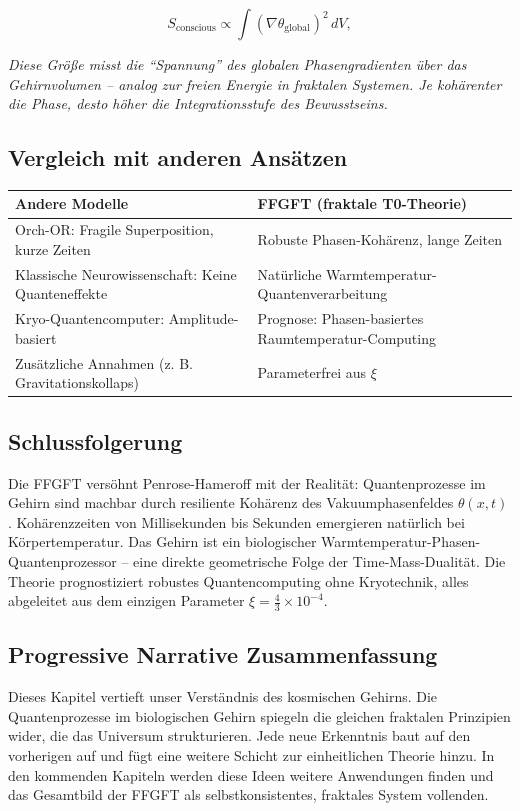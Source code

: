 	\begin{equation}
		S_{\text{conscious}} \propto \int (\nabla \theta_{\text{global}})^2 \, dV,
	\end{equation}
	
	\textit{Diese Größe misst die \enquote{Spannung} des globalen Phasengradienten über das Gehirnvolumen – analog zur freien Energie in fraktalen Systemen. Je kohärenter die Phase, desto höher die Integrationsstufe des Bewusstseins.}
	
	\subsection*{Vergleich mit anderen Ansätzen}
	
	\begin{center}
		\begin{tabular}{p{}p{}}
			\textbf{Andere Modelle} & \textbf{FFGFT (fraktale T0-Theorie)} \\
			\hline
			Orch-OR: Fragile Superposition, kurze Zeiten & Robuste Phasen-Kohärenz, lange Zeiten \\
			Klassische Neurowissenschaft: Keine Quanteneffekte & Natürliche Warmtemperatur-Quantenverarbeitung \\
			Kryo-Quantencomputer: Amplitude-basiert & Prognose: Phasen-basiertes Raumtemperatur-Computing \\
			Zusätzliche Annahmen (z. B. Gravitationskollaps) & Parameterfrei aus \(\xi\) \\
		\end{tabular}
	\end{center}
	
	\subsection*{Schlussfolgerung}
	
	Die FFGFT versöhnt Penrose-Hameroff mit der Realität: Quantenprozesse im Gehirn sind machbar durch resiliente Kohärenz des Vakuumphasenfeldes \(\theta(x,t)\). Kohärenzzeiten von Millisekunden bis Sekunden emergieren natürlich bei Körpertemperatur. Das Gehirn ist ein biologischer Warmtemperatur-Phasen-Quantenprozessor – eine direkte geometrische Folge der Time-Mass-Dualität. Die Theorie prognostiziert robustes Quantencomputing ohne Kryotechnik, alles abgeleitet aus dem einzigen Parameter \(\xi = \frac{4}{3} \times 10^{-4}\).
	
	\subsection*{Progressive Narrative Zusammenfassung}
	
	Dieses Kapitel vertieft unser Verständnis des kosmischen Gehirns. Die Quantenprozesse im biologischen Gehirn spiegeln die gleichen fraktalen Prinzipien wider, die das Universum strukturieren. Jede neue Erkenntnis baut auf den vorherigen auf und fügt eine weitere Schicht zur einheitlichen Theorie hinzu. In den kommenden Kapiteln werden diese Ideen weitere Anwendungen finden und das Gesamtbild der FFGFT als selbstkonsistentes, fraktales System vollenden.




